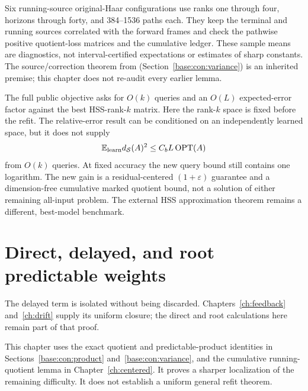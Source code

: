 \documentclass[11pt,oneside,openany,a4paper]{book}
\numberwithin{equation}{chapter}
\theoremstyle{definition}
\theoremstyle{remark}
\newcommand{\R}{\mathbb R}\newcommand{\E}{\mathbb E}\newcommand{\Prb}{\mathbb P}\newcommand{\PP}{\mathbb P}
\newcommand{\T}{\mathsf T}\newcommand{\Id}{I}
\newcommand{\F}[1]{\left\lVert#1\right\rVert_F}
\DeclareMathOperator{\tr}{tr}\DeclareMathOperator{\rank}{rank}
\begin{document}
Six running-source original-Haar configurations use ranks one through four, horizons through forty, and 384--1536 paths each. They keep the terminal and running sources correlated with the forward frames and check the pathwise positive quotient-loss matrices and the cumulative ledger. These sample means are diagnostics, not interval-certified expectations or estimates of sharp constants. The source/correction theorem from (Section~\ref{base:con:variance}) is an inherited premise; this chapter does not re-audit every earlier lemma.

The full public objective asks for $O(k)$ queries and an $O(L)$ expected-error factor against the best HSS-rank-$k$ matrix. Here the rank-$k$ space is fixed before the refit. The relative-error result can be conditioned on an independently learned space, but it does not supply
\[
 \E_{\rm learn}d_{\mathcal S}(A)^2\le C_bL\,\mathrm{OPT}(A)
\]
from $O(k)$ queries. At fixed accuracy the new query bound still contains one logarithm. The new gain is a residual-centered $(1+\varepsilon)$ guarantee and a dimension-free cumulative marked quotient bound, not a solution of either remaining all-input problem. The external HSS approximation theorem \cite{AmselHSS} remains a different, best-model benchmark.

\begingroup\footnotesize
\endgroup

\endgroup

\begingroup
\let\E\relax
\newcommand{\E}{\mathbb E}
\let\R\relax
\newcommand{\R}{\mathbb R}
\let\F\relax
\newcommand{\F}[1]{\lVert#1\rVert_F}
\let\T\relax
\newcommand{\T}{\mathsf T}
\let\tr\relax
\newcommand{\tr}{\operatorname{tr}}
\chapter{Direct, delayed, and root predictable weights}\label{ch:delayed}
\begin{scopebox}
The delayed term is isolated without being discarded. Chapters~\ref{ch:feedback} and~\ref{ch:drift} supply its uniform closure; the direct and root calculations here remain part of that proof.
\end{scopebox}
This chapter uses the exact quotient and predictable-product identities in
Sections~\ref{base:con:product} and~\ref{base:con:variance}, and the cumulative running-quotient lemma in Chapter~\ref{ch:centered}. It proves a sharper
localization of the remaining difficulty. It does not establish a
uniform general refit theorem.
\end{document}
